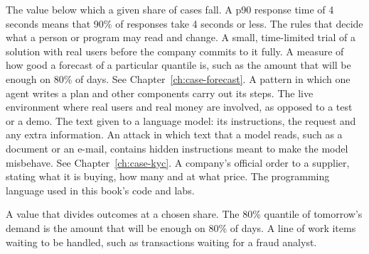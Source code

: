 \begin{description}[style=nextline, leftmargin=1.2em, itemsep=4pt, font=\normalfont\bfseries\sffamily\small]
 The value below which a given share of cases fall. A p90 response time of 4 seconds means that 90\% of responses take 4 seconds or less.
 The rules that decide what a person or program may read and change.
 A small, time-limited trial of a solution with real users before the company commits to it fully.
 A measure of how good a forecast of a particular quantile is, such as the amount that will be enough on 80\% of days. See Chapter~\ref{ch:case-forecast}.
 A pattern in which one agent writes a plan and other components carry out its steps.
 The live environment where real users and real money are involved, as opposed to a test or a demo.
 The text given to a language model: its instructions, the request and any extra information.
 An attack in which text that a model reads, such as a document or an e-mail, contains hidden instructions meant to make the model misbehave. See Chapter~\ref{ch:case-kyc}.
 A company's official order to a supplier, stating what it is buying, how many and at what price.
 The programming language used in this book's code and labs.

 A value that divides outcomes at a chosen share. The 80\% quantile of tomorrow's demand is the amount that will be enough on 80\% of days.
 A line of work items waiting to be handled, such as transactions waiting for a fraud analyst.


\end{description}
